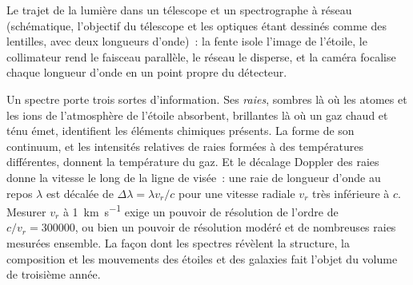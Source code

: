 \begin{omfigure}

{\small Le trajet de la lumière dans un télescope et un spectrographe à réseau
(schématique, l'objectif du télescope et les optiques étant dessinés comme des
lentilles, avec deux longueurs d'onde)~: la fente isole l'image de l'étoile, le
collimateur rend le faisceau parallèle, le réseau le disperse, et la caméra
focalise chaque longueur d'onde en un point propre du détecteur.}
\end{omfigure}

Un spectre porte trois sortes d'information. Ses \emph{raies}, sombres là où
les atomes et les ions de l'atmosphère de l'étoile absorbent, brillantes là où
un gaz chaud et ténu émet, identifient les éléments chimiques présents. La
forme de son continuum, et les intensités relatives de raies formées à des
températures différentes, donnent la température du gaz. Et le décalage Doppler
des raies donne la vitesse le long de la ligne de visée~: une raie de longueur
d'onde au repos $\lambda$ est décalée de $\Delta\lambda = \lambda v_r/c$ pour
une vitesse radiale $v_r$ très inférieure à $c$. Mesurer $v_r$ à
\qty{1}{km.s^{-1}} exige un pouvoir de résolution de l'ordre de
$c/v_r = \num{300000}$, ou bien un pouvoir de résolution modéré et de nombreuses
raies mesurées ensemble. La façon dont les spectres révèlent la structure, la
composition et les mouvements des étoiles et des galaxies fait l'objet du
volume de troisième année.

